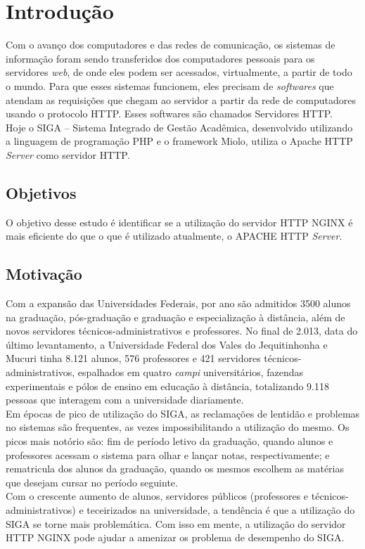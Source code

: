 \chapter{Introdução}\label{introducao}
Com o avanço dos computadores e das redes de comunicação, os sistemas de informação foram sendo transferidos dos computadores pessoais para os servidores \textit{web}, de onde eles podem ser acessados, virtualmente, a partir de todo o mundo. Para que esses sistemas funcionem, eles precisam de \textit{softwares} que atendam as requisições que chegam ao servidor a partir da rede de computadores usando o protocolo HTTP. Esses softwares são chamados Servidores HTTP.\\
Hoje o SIGA – Sistema Integrado de Gestão Acadêmica, desenvolvido utilizando a linguagem de programação PHP e o framework Miolo, utiliza o Apache HTTP \textit{Server} como servidor HTTP.\\
\section{Objetivos}
O objetivo desse estudo é identificar se a utilização do servidor HTTP NGINX é mais eficiente do que o que é utilizado atualmente, o APACHE HTTP \textit{Server}.\\
\section{Motivação}
Com a expansão das Universidades Federais, por ano são admitidos 3500 alunos na graduação, pós-graduação e graduação e especialização à distância, além de novos servidores técnicos-administrativos e professores. No final de 2.013, data do último levantamento, a Universidade Federal dos Vales do Jequitinhonha e Mucuri tinha 8.121 alunos, 576 professores e 421 servidores técnicos-administrativos, espalhados em quatro \textit{campi} universitários, fazendas experimentais e pólos de ensino em educação à distância, totalizando 9.118 pessoas que interagem com a universidade diariamente.\\
Em épocas de pico de utilização do SIGA, as reclamações de lentidão e problemas no sistemas são frequentes, as vezes impossibilitando a utilização do mesmo. Os picos mais notório são: fim de período letivo da graduação, quando alunos e professores acessam o sistema para olhar e lançar notas, respectivamente; e rematricula dos alunos da graduação, quando os mesmos escolhem as matérias que desejam cursar no período seguinte.\\
Com o crescente aumento de alunos, servidores públicos (professores e técnicos-administrativos) e teceirizados na universidade, a tendência é que a utilização do SIGA se torne mais problemática.
Com isso em mente, a utilização do servidor HTTP NGINX pode ajudar a amenizar os problema de desempenho do SIGA.\\
